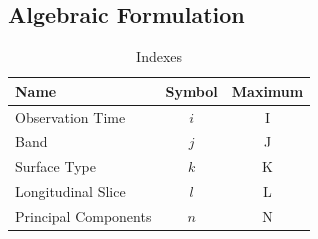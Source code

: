 \documentclass[iop,numberedappendix,apj,]{emulateapj}
\begin{document}
\subsection{Algebraic Formulation}
\label{ss:model}


\begin{table}[b]
\caption{Indexes}
\begin{center}
\begin{tabular}{lcc} \hline \hline
Name & Symbol & Maximum \\ \hline
Observation Time & $i$ & I \\
Band & $j$ & J  \\
Surface Type & $k$ & K  \\
Longitudinal Slice  & $l$ & L \\ 
Principal Components & $n$ & N \\ \hline
\end{tabular}
\end{center}
\label{tab:index}
\end{table}%
\end{document}
